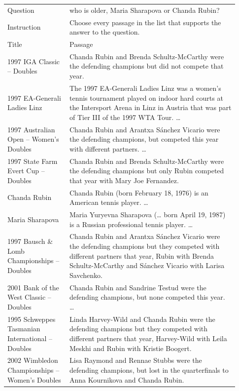 \begin{tabular}{@{}p{0.25\linewidth}p{0.68\linewidth}@{}}
\toprule
Question & who is older, Maria Sharapova or Chanda Rubin? \\
Instruction & Choose every passage in the list that supports the answer to the question. \\
\midrule
Title & Passage \\
\midrule
1997 IGA Classic -- Doubles & Chanda Rubin and Brenda Schultz-McCarthy were the defending champions but did not compete that year. \\
1997 EA-Generali Ladies Linz & The 1997 EA-Generali Ladies Linz was a women's tennis tournament played on indoor hard courts at the Intersport Arena in Linz in Austria that was part of Tier III of the 1997 WTA Tour.  \ldots \\
1997 Australian Open -- Women's Doubles & Chanda Rubin and Arantxa S\'{a}nchez Vicario were the defending champions, but competed this year with different partners.  \ldots \\
1997 State Farm Evert Cup -- Doubles & Chanda Rubin and Brenda Schultz-McCarthy were the defending champions but only Rubin competed that year with Mary Joe Fernandez. \\
Chanda Rubin & Chanda Rubin (born February 18, 1976) is an American tennis player.  \ldots \\
Maria Sharapova & Maria Yuryevna Sharapova (\ldots{} born April 19, 1987) is a Russian professional tennis player.  \ldots \\
1997 Bausch \& Lomb Championships -- Doubles & Chanda Rubin and Arantxa S\'{a}nchez Vicario were the defending champions but they competed with different partners that year, Rubin with Brenda Schultz-McCarthy and S\'{a}nchez Vicario with Larisa Savchenko. \\
2001 Bank of the West Classic -- Doubles & Chanda Rubin and Sandrine Testud were the defending champions, but none competed this year.  \ldots \\
1995 Schweppes Tasmanian International -- Doubles & Linda Harvey-Wild and Chanda Rubin were the defending champions but they competed with different partners that year, Harvey-Wild with Leila Meskhi and Rubin with Kristie Boogert. \\
2002 Wimbledon Championships -- Women's Doubles & Lisa Raymond and Rennae Stubbs were the defending champions, but lost in the quarterfinals to Anna Kournikova and Chanda Rubin. \\
\bottomrule
\end{tabular}
